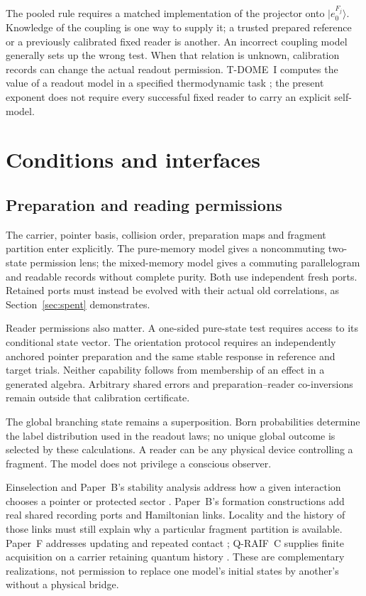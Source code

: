 \documentclass[12pt,a4paper]{article}
\begin{document}
The pooled rule requires a matched implementation of the projector onto $|e_0^{F_j}\rangle$. Knowledge of the coupling is one way to supply it; a trusted prepared reference or a previously calibrated fixed reader is another. An incorrect coupling model generally sets up the wrong test. When that relation is unknown, calibration records can change the actual readout permission. T-DOME~I computes the value of a readout model in a specified thermodynamic task \cite{Liu2026TDOME_I}; the present exponent does not require every successful fixed reader to carry an explicit self-model.

\section{Conditions and interfaces}
\label{sec:scope}
\subsection{Preparation and reading permissions}

The carrier, pointer basis, collision order, preparation maps and
fragment partition enter explicitly. The pure-memory model gives
a noncommuting two-state permission lens; the mixed-memory model
gives a commuting parallelogram and readable records without
complete purity. Both use independent fresh ports. Retained ports
must instead be evolved with their actual old correlations, as
Section~\ref{sec:spent} demonstrates.

Reader permissions also matter. A one-sided pure-state test
requires access to its conditional state vector. The orientation
protocol requires an independently anchored pointer preparation
and the same stable response in reference and target trials.
Neither capability follows from membership of an effect in a
generated algebra. Arbitrary shared errors and preparation--reader
co-inversions remain outside that calibration certificate.

The global branching state remains a superposition. Born
probabilities determine the label distribution used in the
readout laws; no unique global outcome is selected by these
calculations. A reader can be any physical device controlling a
fragment. The model does not privilege a conscious observer.

Einselection and Paper~B's stability analysis address how a given
interaction chooses a pointer or protected sector
\cite{Zurek2003,Liu2026PaperB}. Paper~B's formation constructions
add real shared recording ports and Hamiltonian links. Locality
and the history of those links must still explain why a particular
fragment partition is available. Paper~F addresses updating and
repeated contact \cite{Liu2026PaperF}; Q-RAIF~C supplies finite
acquisition on a carrier retaining quantum history
\cite{Liu2026QRAIFC}. These are complementary realizations, not
permission to replace one model's initial states by another's
without a physical bridge.
\end{document}
